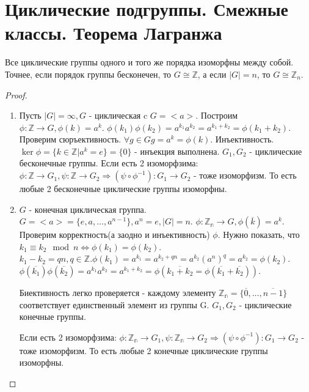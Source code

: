 \section{Циклические подгруппы. Смежные классы. Теорема Лагранжа}
\begin{theorem}
	Все циклические группы одного и того же порядка изоморфны между собой. Точнее, если порядок группы бесконечен, то \(G\cong \mathbb{Z}\), а если \(|G| = n\), то \(G\cong \mathbb{Z}_n\).
\end{theorem}
\begin{proof}
	\begin{enumerate}
		\item Пусть \(|G|=\infty, G\) - циклическая c \(G=<a>\).\newline
		 Построим \(\phi: \mathbb{Z}\to G, \phi(k) = a^k\). \(\phi(k_1)\phi(k_2) = a^{k_1}a^{k_2}  = a^{k_1+k_2}= \phi(k_1+k_2)\). \newline 
		 Проверим сюръективность. \(\forall g\in G g = a^k = \phi(k)\).
		 \newline Инъективность. \(\ker \phi = \{k\in\mathbb{Z}|a^k=e\} = \{0\}\) - инъекция выполнена.
		\(G_1, G_2\) - циклические бесконечные группы. \newline 
		Если есть 2 изоморфзима: \(\phi: \mathbb{Z}\to G_1, \psi: \mathbb{Z}\to G_2 \Longrightarrow (\psi\circ\phi^{-1}):G_1\to G_2\) - тоже изоморфизм. То есть любые 2 бесконечные циклические группы изоморфны.
		\item \(G\) - конечная циклическая группа. \(G = <a> = \{e, a, \ldots, a^{n-1}\}, a^n = e, |G| = n\). \(\phi: \mathbb{Z_n}\to G, \phi(\overline k) = a^k\). Проверим корректность(а заодно и инъективность) $\phi$.\newline
		 Нужно показать, что \(k_1 \equiv k_2 \mod n \Longleftrightarrow \phi(k_1) = \phi(k_2)\). \(k_1-k_2 = qn, q \in \mathbb{Z}. \phi(k_1) = a^{k_1} = a^{k_2+qn} = a^{k_2}(a^n)^q = a^{k_2}=\phi(k_2)\). \(\phi(\overline{k_1})\phi(\overline{k_2}) = a^{k_1}a^{k_2} = a^{k_1+k_2} = \phi(\overline{k_1+k_2} = \phi(\overline{k_1}+\overline{k_2}))\).\newline
		 
		 Биективность легко проверяется - каждому элементу \(\mathbb{Z_n} = \{\overline 0, \ldots, \overline{n-1}\}\) соответствует единственный элемент из группы G. 
		\(G_1, G_2\) - циклические конечные группы. \newline
		
		Если есть 2 изоморфзима: \(\phi: \mathbb{Z_n}\to G_1, \psi: \mathbb{Z_n}\to G_2 \Longrightarrow (\psi\circ\phi^{-1}):G_1\to G_2\) - тоже изоморфизм. То есть любые 2 конечные циклические группы изоморфны.
	\end{enumerate}
\end{proof}
